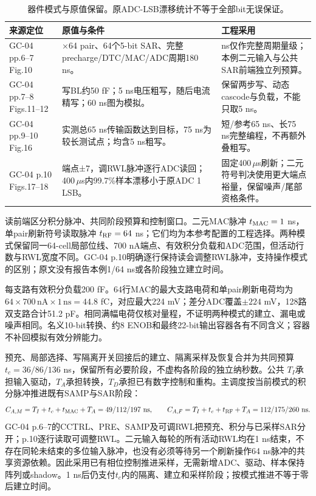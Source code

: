 \begin{table}[htbp]\centering\small
\begin{tabularx}{\textwidth}{@{}>{\raggedright\arraybackslash}p{30mm}>{\raggedright\arraybackslash}X>{\raggedright\arraybackslash}X@{}}\toprule
来源定位 & 原值与条件 & 工程采用\\\midrule
GC-04 pp.6--7 Fig.10 & 64×64 pair、64个5-bit SAR、完整precharge/DTC/MAC/ADC周期180 ns。 & 180 ns仅作完整周期量级；本例二元输入与公共SAR前端独立列预算。\\
GC-04 pp.7--8 Figs.11--12 & 写BL约50 fF；5 ns电压粗写，随后电流精写；60 ns图为模拟。 & 保留两步写、动态cascode与负载，不能只取5 ns。\\
GC-04 pp.9--10 Fig.16 & 实测总65 ns传输函数达到目标，75 ns为较长测试点；均含5 ns粗写。 & 短/参考65 ns、长75 ns完整编程，不再额外叠粗写。\\
GC-04 p.10 Figs.17--18 & 端点±7，调RWL脉冲逐行ADC读回；400\,$\mu$s内99.7\%样本漂移小于原ADC 1 LSB。 & 固定400\,$\mu$s刷新；二元符号判决使用更大端点裕量，保留噪声/尾部资格条件。\\\bottomrule
\end{tabularx}
\caption{器件模式与原值保留。原ADC-LSB漂移统计不等于全部bit无误保证。}
\end{table}

读前端区分积分脉冲、共同阶段预算和控制窗口。二元MAC脉冲 $t_{\rm MAC}=1$ ns，单pair刷新符号读取脉冲 $t_{\rm RF}=64$ ns；它们均为本参考配置的工程选择。两种模式保留同一64-cell局部位线、700 nA端点、有效积分负载和ADC范围，但活动行数与RWL宽度不同。GC-04 p.10明确逐行保持读会调整RWL脉冲，支持操作模式的区别；原文没有报告本例1/64 ns或各阶段独立建立时间。

每支路有效积分负载200 fF。64行MAC的最大支路电荷和单pair刷新电荷均为 $64\times700\,\mathrm{nA}\times1\,\mathrm{ns}=44.8$ fC，对应最大224 mV；差分ADC覆盖$\pm224$ mV，128路双支路合计51.2 pF。相同满幅电荷仅核对量程，不证明两种模式的建立、漏电或噪声相同。名义10-bit转换、约8 ENOB和最终22-bit输出容器各有不同含义；容器不补回模拟有效分辨能力。

预充、局部选择、写隔离开关回接后的建立、隔离采样及恢复合并为共同预算 $t_c=36/86/136$ ns，保留所有必要阶段，不虚构各阶段的独立纳秒数。公共 $T_I$承担输入驱动，$T_A$承担转换，$T_D$承担已有数字控制和重构。主调度按当前模式的积分脉冲推进既有SAMP与SAR阶段：
\[
C_{A,M}=T_I+t_c+t_{\rm MAC}+T_A=49/112/197\ \mathrm{ns},\qquad
C_{A,F}=T_I+t_c+t_{\rm RF}+T_A=112/175/260\ \mathrm{ns}.
\]
GC-04 p.6--7的CCTRL、PRE、SAMP及可调RWL把预充、积分与已采样SAR分开；p.10逐行读取可调整RWL。二元输入每轮的所有活动RWL均在1 ns结束，不存在同轮未结束的多位输入脉冲，也没有必须等待另一个刷新操作64 ns脉冲的共享资源依赖。因此采用已有相位控制推进采样，无需新增ADC、驱动、样本保持阵列或shadow。1 ns后仍支付$t_c$内的隔离、建立和采样阶段；按模式推进不等于零后建立时间。


